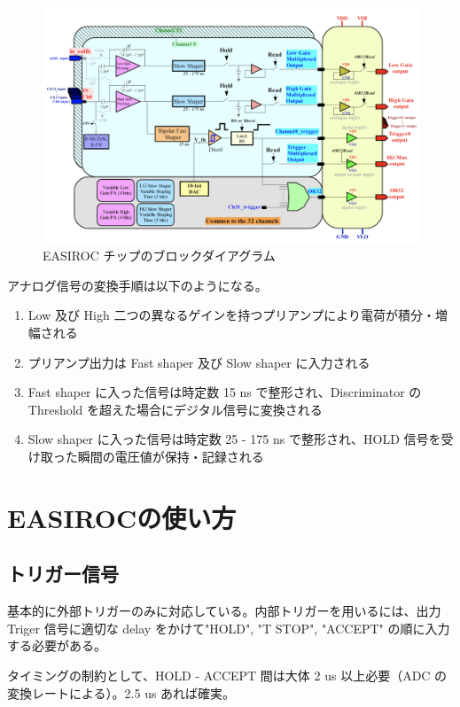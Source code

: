 \documentclass{jsarticle}
\begin{document}
\begin{figure}[H]
\begin{center}
\includegraphics[width = 13.0cm, bb= 0 0 1167 735]{5.png}
\end{center}
\caption{EASIROC チップのブロックダイアグラム}
\label{fig:}
\end{figure}

アナログ信号の変換手順は以下のようになる。
\begin{enumerate}
\item Low 及び High 二つの異なるゲインを持つプリアンプにより電荷が積分・増幅される
\item プリアンプ出力は Fast shaper 及び Slow shaper に入力される
\item Fast shaper に入った信号は時定数 15 ns で整形され、Discriminator の Threshold を超えた場合にデジタル信号に変換される
\item Slow shaper に入った信号は時定数 25 - 175 ns で整形され、HOLD 信号を受け取った瞬間の電圧値が保持・記録される
\end{enumerate}


\newpage
\section{EASIROCの使い方}
\subsection{トリガー信号}
基本的に外部トリガーのみに対応している。内部トリガーを用いるには、出力 Triger 信号に適切な delay をかけて"HOLD", "T STOP", "ACCEPT" の順に入力する必要がある。

タイミングの制約として、HOLD - ACCEPT 間は大体 2 us 以上必要（ADC の変換レートによる）。2.5 us あれば確実。
\end{document}
